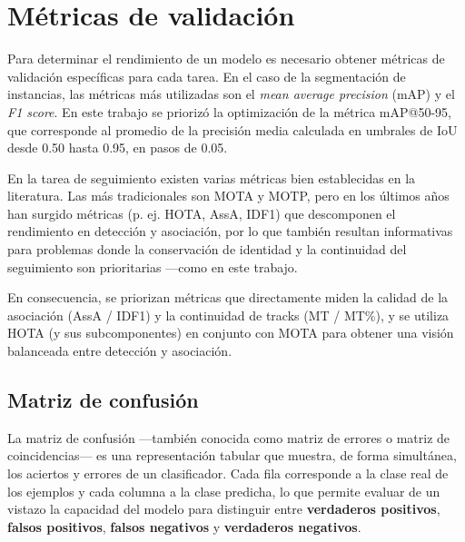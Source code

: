\section{Métricas de validación}
Para determinar el rendimiento de un modelo es necesario obtener métricas de validación específicas para cada tarea. En el caso de la segmentación de instancias, las métricas más utilizadas son el \textit{mean average precision} (mAP) y el \textit{F1 score}. En este trabajo se priorizó la optimización de la métrica mAP@50-95, que corresponde al promedio de la precisión media calculada en umbrales de IoU desde 0.50 hasta 0.95, en pasos de 0.05.

 En la tarea de seguimiento existen varias métricas bien establecidas en la literatura. Las más tradicionales son MOTA y MOTP, pero en los últimos años han surgido métricas (p. ej. HOTA, AssA, IDF1) que descomponen el rendimiento en detección y asociación, por lo que también resultan informativas para problemas donde la conservación de identidad y la continuidad del seguimiento son prioritarias ---como en este trabajo.

 En consecuencia, se priorizan métricas que directamente miden la calidad de la asociación (AssA / IDF1) y la continuidad de tracks (MT / MT\%), y se utiliza HOTA (y sus subcomponentes) en conjunto con MOTA para obtener una visión balanceada entre detección y asociación.

\subsection{Matriz de confusión}
La matriz de confusión ---también conocida como matriz de errores o matriz de coincidencias--- es una representación tabular que muestra, de forma simultánea, los aciertos y errores de un clasificador. Cada fila corresponde a la clase real de los ejemplos y cada columna a la clase predicha, lo que permite evaluar de un vistazo la capacidad del modelo para distinguir entre \textbf{verdaderos positivos}, \textbf{falsos positivos}, \textbf{falsos negativos} y \textbf{verdaderos negativos}.

